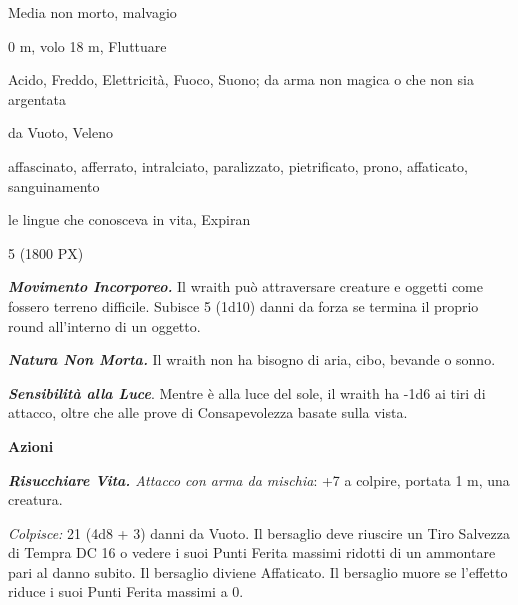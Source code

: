 \begin{multicols}{2}
{
\begin{description}[noitemsep, topsep=0pt, parsep=0pt, partopsep=0pt, itemsep=1pt, leftmargin=2.35cm,  labelwidth=2.2cm, itemindent=0cm, listparindent=0pt] %
\setlength{\baselineskip}{10pt}
\item[\textbf{Taglia/Tipo}] Media non morto, malvagio
\item[\textbf{Caratt.}] 
\item[\textbf{Punti Ferita}] 
\item[\textbf{Movimento}] 0 m, volo 18 m, Fluttuare
\item[\textbf{Tiri Salvez.}] 
\item[\textbf{Res. Danni}] Acido, Freddo, Elettricità, Fuoco, Suono; da arma non magica o che non sia argentata
\item[\textbf{Imm. Danni}] da Vuoto, Veleno
\item[\textbf{Immunità}] affascinato, afferrato, intralciato, paralizzato, pietrificato, prono, affaticato, sanguinamento
\item[\textbf{Sensi}] 
\item[\textbf{Linguaggi}] le lingue che conosceva in vita, Expiran
\item[\textbf{Sfida}] 5 (1800 PX)
\end{description}
\smallskip

\emph{\textbf{Movimento Incorporeo.}} Il wraith può attraversare creature e oggetti come fossero terreno difficile. Subisce 5 (1d10) danni da forza se termina il proprio round all'interno di un oggetto.

\emph{\textbf{Natura Non Morta.}} Il wraith non ha bisogno di aria, cibo, bevande o sonno.

\emph{\textbf{Sensibilità alla Luce}}. Mentre è alla luce del sole, il wraith ha -1d6 ai tiri di attacco, oltre che alle prove di Consapevolezza basate sulla vista.

\textbf{Azioni}

\emph{\textbf{Risucchiare Vita.} Attacco con arma da mischia}: +7 a colpire, portata 1 m, una creatura.

\emph{Colpisce:} 21 (4d8 + 3) danni da Vuoto. Il bersaglio deve riuscire un Tiro Salvezza di Tempra DC 16 o vedere i suoi Punti Ferita massimi ridotti di un ammontare pari al danno subito. Il bersaglio diviene Affaticato. Il bersaglio muore se l'effetto riduce i suoi Punti Ferita massimi a 0.

}
\end{multicols}
